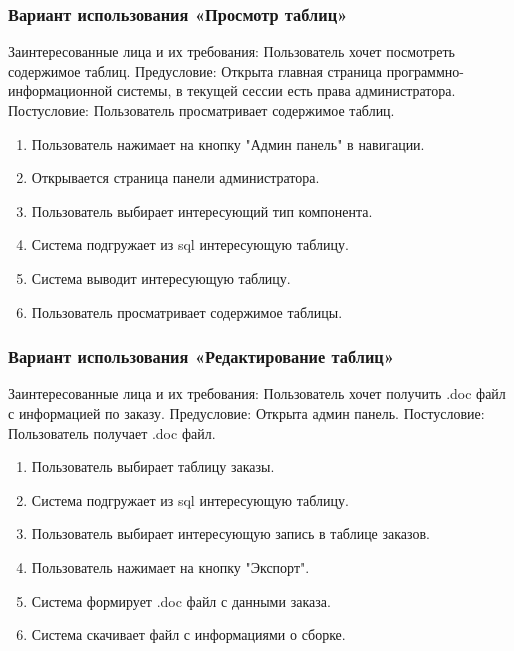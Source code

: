 \subsubsection{Вариант использования «Просмотр таблиц»}
Заинтересованные лица и их требования: Пользователь хочет посмотреть содержимое таблиц.
Предусловие: Открыта главная страница программно-информационной системы, в текущей сессии есть права администратора.
Постусловие: Пользователь просматривает содержимое таблиц.
\begin{enumerate}
	\item Пользователь нажимает на кнопку "Админ панель" в навигации.
	\item Открывается страница панели администратора.
	\item Пользователь выбирает интересующий тип компонента.
	\item Система подгружает из sql интересующую таблицу.
	\item Система выводит интересующую таблицу.
	\item Пользователь просматривает содержимое таблицы.
\end{enumerate}

\subsubsection{Вариант использования «Редактирование таблиц»}
Заинтересованные лица и их требования: Пользователь хочет получить .doc файл с информацией по заказу.
Предусловие: Открыта админ панель.
Постусловие: Пользователь получает .doc файл.
\begin{enumerate}
	\item Пользователь выбирает таблицу заказы.
	\item Система подгружает из sql интересующую таблицу.
	\item Пользователь выбирает интересующую запись в таблице заказов.
	\item Пользователь нажимает на кнопку "Экспорт".
	\item Система формирует .doc файл с данными заказа.
	\item Система скачивает файл с информациями о сборке.
\end{enumerate}

